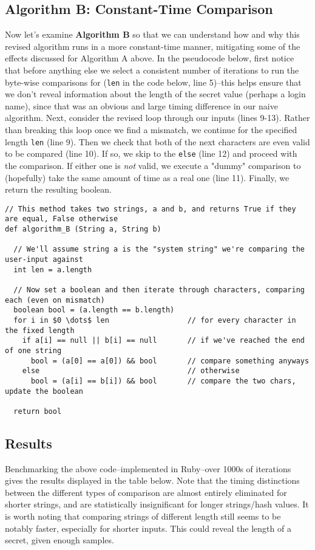 \documentclass{article}
\providecommand{\inlinecode}{\texttt}
\begin{document}
\subsection{Algorithm B: Constant-Time Comparison}
Now let's examine \textbf{Algorithm B} so that we can understand how and why this revised algorithm runs in a more constant-time manner, mitigating some of the effects discussed for Algorithm A above.
In the pseudocode below, first notice that before anything else we select a consistent number of iterations to run the byte-wise comparisons for (\inlinecode{len} in the code below, line 5)--this helps ensure that we don't reveal information about the length of the secret value (perhaps a login name), since that was an obvious and large timing difference in our naive algorithm.
Next, consider the revised loop through our inputs (lines 9-13). Rather than breaking this loop once we find a mismatch, we continue for the specified length \inlinecode{len} (line 9).
Then we check that both of the next characters are even valid to be compared (line 10). If so, we skip to the \inlinecode{else} (line 12) and proceed with the comparison. If either one is \textit{not} valid, we execute a "dummy" comparison to (hopefully) take the same amount of time as a real one (line 11).
Finally, we return the resulting boolean.

\begin{lstlisting}
// This method takes two strings, a and b, and returns True if they are equal, False otherwise
def algorithm_B (String a, String b)

  // We'll assume string a is the "system string" we're comparing the user-input against
  int len = a.length

  // Now set a boolean and then iterate through characters, comparing each (even on mismatch)
  boolean bool = (a.length == b.length)
  for i in $0 \dots$ len                  // for every character in the fixed length
    if a[i] == null || b[i] == null       // if we've reached the end of one string
      bool = (a[0] == a[0]) && bool       // compare something anyways
    else                                  // otherwise
      bool = (a[i] == b[i]) && bool       // compare the two chars, update the boolean

  return bool
\end{lstlisting}


\subsection{Results}
Benchmarking the above code--implemented in Ruby--over 1000s of iterations gives the results displayed in the table below. Note that the timing distinctions between the different types of comparison are almost entirely eliminated for shorter strings, and are statistically insignificant for longer strings/hash values. It is worth noting that comparing strings of different length still seems to be notably faster, especially for shorter inputs. This could reveal the length of a secret, given enough samples.
\end{document}
